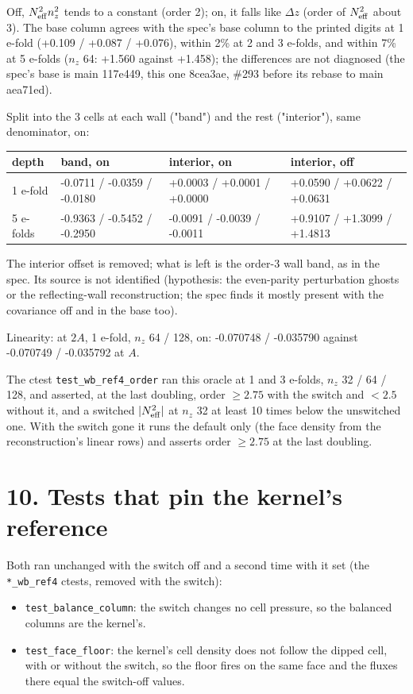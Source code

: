 \documentclass[11pt,a4paper]{article}
\begin{document}
Off, $N^2_{\rm eff}n_z^2$ tends to a constant (order 2); on, it falls like $\Delta z$ (order of $N^2_{\rm eff}$
about 3). The base column agrees with the spec's base column to the printed digits at 1 e-fold (+0.109 / +0.087 /
+0.076), within 2\% at 2 and 3 e-folds, and within 7\% at 5 e-folds ($n_z$ 64: +1.560 against +1.458); the
differences are not diagnosed (the spec's base is main 117e449, this one 8cea3ae, \#293 before its rebase to main aea71ed).

Split into the 3 cells at each wall ("band") and the rest ("interior"), same denominator, on:

\begin{longtable}{llll}
\toprule
depth & band, on & interior, on & interior, off \\
\midrule
1 e-fold & -0.0711 / -0.0359 / -0.0180 & +0.0003 / +0.0001 / +0.0000 & +0.0590 / +0.0622 / +0.0631 \\
5 e-folds & -0.9363 / -0.5452 / -0.2950 & -0.0091 / -0.0039 / -0.0011 & +0.9107 / +1.3099 / +1.4813 \\
\bottomrule
\end{longtable}

The interior offset is removed; what is left is the order-3 wall band, as in the spec. Its source is not
identified (hypothesis: the even-parity perturbation ghosts or the reflecting-wall reconstruction; the spec
finds it mostly present with the covariance off and in the base too).

Linearity: at $2A$, 1 e-fold, $n_z$ 64 / 128, on: -0.070748 / -0.035790 against -0.070749 / -0.035792 at $A$.

The ctest \texttt{test\_wb\_ref4\_order} ran this oracle at 1 and 3 e-folds, $n_z$ 32 / 64 / 128, and asserted, at the last
doubling, order $\ge 2.75$ with the switch and $< 2.5$ without it, and a switched $\lvert N^2_{\rm eff}\rvert$
at $n_z$ 32 at least 10 times below the unswitched one. With the switch gone it runs the default only (the face
density from the reconstruction's linear rows) and asserts order $\ge 2.75$ at the last doubling.

\section*{10. Tests that pin the kernel's reference}

Both ran unchanged with the switch off and a second time with it set (the \texttt{*\_wb\_ref4} ctests, removed with
the switch):

\begin{itemize}
\item \texttt{test\_balance\_column}: the switch changes no cell pressure, so the balanced columns are the kernel's.
\item \texttt{test\_face\_floor}: the kernel's cell density does not follow the dipped cell, with or without the switch,
  so the floor fires on the same face and the fluxes there equal the switch-off values.
\end{itemize}
\end{document}
